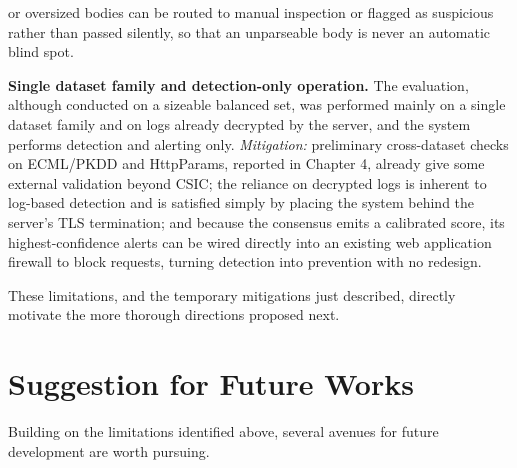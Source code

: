 \documentclass[../main.tex]{subfiles}
\begin{document}
\begin{romanlist}
        or oversized bodies can be routed to manual inspection or flagged as
        suspicious rather than passed silently, so that an unparseable body is
        never an automatic blind spot.
  \item \textbf{Single dataset family and detection-only operation.} The
        evaluation, although conducted on a sizeable balanced set, was
        performed mainly on a single dataset family and on logs already
        decrypted by the server, and the system performs detection and
        alerting only. \emph{Mitigation:} preliminary cross-dataset checks on
        ECML/PKDD and HttpParams, reported in Chapter 4, already give some
        external validation beyond CSIC; the reliance on decrypted logs is
        inherent to log-based detection and is satisfied simply by placing the
        system behind the server's TLS termination; and because the consensus
        emits a calibrated score, its highest-confidence alerts can be wired
        directly into an existing web application firewall to block requests,
        turning detection into prevention with no redesign.
\end{romanlist}

These limitations, and the temporary mitigations just described, directly
motivate the more thorough directions proposed next.

\section{Suggestion for Future Works}
\label{sec:future}

Building on the limitations identified above, several avenues for future
development are worth pursuing.
\end{document}
